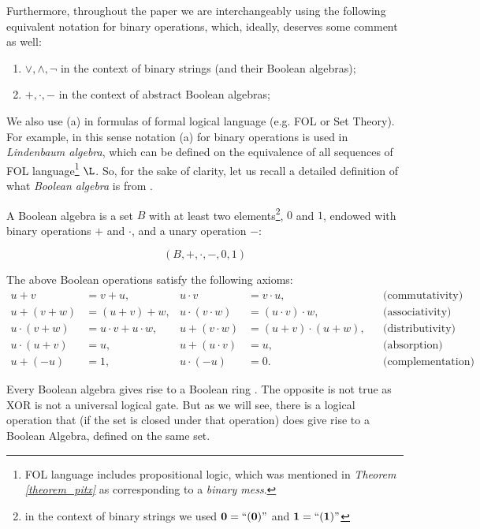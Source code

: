 Furthermore, throughout the paper we are interchangeably using the following equivalent notation for binary operations, which, ideally, deserves some comment as well:
  \begin{enumerate}[label=(\alph*)]
    \item $\lor, \land, \neg$ in the context of binary strings (and their Boolean algebras);
    \item $+, \cdot, -$ in the context of abstract Boolean algebras;
  \end{enumerate}
We also use (a) in formulas of formal logical language (e.g. FOL or Set Theory). For example, in this sense notation (a) for binary operations is used in \textit{Lindenbaum algebra}, which can be defined \cite{jech2003set} on the equivalence of  all sequences of FOL language\footnote{FOL language includes propositional logic, which was mentioned in \textit{Theorem \ref{theorem_pitx}} as corresponding to a \textit{binary mess}.} $\L$. So, for the sake of clarity, let us recall a detailed definition of what \textit{Boolean algebra} is from \cite{jech2003set}.

\begin{definition}\label{def_ba}
  A Boolean algebra is a set $B$ with at least two elements\footnote{in the context of binary strings we used $\bf{0} = \text{``} (0) \text{''}$ and $\bf{1} = \text{``} (1) \text{''}$}, $0$ and $1$, endowed with binary operations $+$ and $\cdot$, and a unary operation $-$:

    \[ (B, +, \cdot, -, 0, 1) \]

  The above Boolean operations satisfy the following axioms:
  \begin{align*}
    u + v &= v + u, & u \cdot v &= v \cdot u, & & \text{(commutativity)} \\
    u + (v + w) &= (u + v) + w, & u \cdot (v \cdot w) &= (u \cdot v) \cdot w, & & \text{(associativity)} \\
    u \cdot (v + w) &= u \cdot v + u \cdot w, & u + (v \cdot w) &= (u + v) \cdot (u + w), & & \text{(distributivity)} \\
    u \cdot (u + v) &= u, & u + (u \cdot v) &= u, & & \text{(absorption)} \\
    u + (-u) &= 1, & u \cdot (-u) &= 0. & & \text{(complementation)}
  \end{align*}
\end{definition} 

Every Boolean algebra gives rise to a Boolean ring \cite{jech2003set}. The opposite is not true as XOR is not a universal logical gate. But as we will see, there is a logical operation that (if the set is closed under that operation) does give rise to a Boolean Algebra, defined on the same set.

